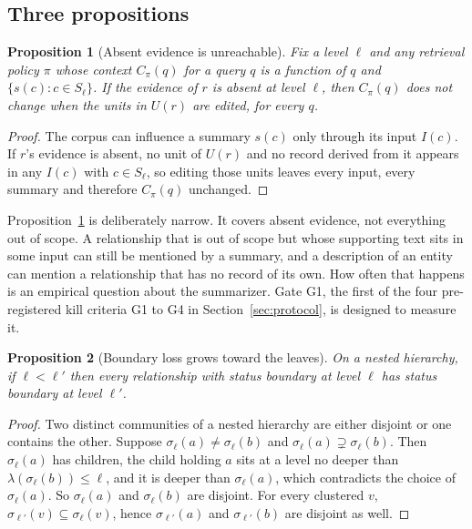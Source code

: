 \documentclass[journal]{IEEEtran}
\newtheorem{proposition}{Proposition}
\theoremstyle{remark}
\newcommand{\Sel}{\sigma_\ell}
\newcommand{\In}{I}
\begin{document}
\subsection{Three propositions}

\begin{proposition}[Absent evidence is unreachable]\label{prop:unreach}
Fix a level $\ell$ and any retrieval policy $\pi$ whose context $C_\pi(q)$ for a query $q$ is a function of $q$ and $\{s(c):c\in S_\ell\}$. If the evidence of $r$ is absent at level $\ell$, then $C_\pi(q)$ does not change when the units in $U(r)$ are edited, for every $q$.
\end{proposition}
\begin{proof}
The corpus can influence a summary $s(c)$ only through its input $\In(c)$. If $r$'s evidence is absent, no unit of $U(r)$ and no record derived from it appears in any $\In(c)$ with $c\in S_\ell$, so editing those units leaves every input, every summary and therefore $C_\pi(q)$ unchanged.
\end{proof}

Proposition~\ref{prop:unreach} is deliberately narrow. It covers absent evidence, not everything out of scope. A relationship that is out of scope but whose supporting text sits in some input can still be mentioned by a summary, and a description of an entity can mention a relationship that has no record of its own. How often that happens is an empirical question about the summarizer. Gate G1, the first of the four pre-registered kill criteria G1 to G4 in Section~\ref{sec:protocol}, is designed to measure it.

\begin{proposition}[Boundary loss grows toward the leaves]\label{prop:mono}
On a nested hierarchy, if $\ell<\ell'$ then every relationship with status boundary at level $\ell$ has status boundary at level $\ell'$.
\end{proposition}
\begin{proof}
Two distinct communities of a nested hierarchy are either disjoint or one contains the other. Suppose $\Sel(a)\ne\Sel(b)$ and $\Sel(a)\supsetneq\Sel(b)$. Then $\Sel(a)$ has children, the child holding $a$ sits at a level no deeper than $\lambda(\Sel(b))\le\ell$, and it is deeper than $\Sel(a)$, which contradicts the choice of $\Sel(a)$. So $\Sel(a)$ and $\Sel(b)$ are disjoint. For every clustered $v$, $\sigma_{\ell'}(v)\subseteq\Sel(v)$, hence $\sigma_{\ell'}(a)$ and $\sigma_{\ell'}(b)$ are disjoint as well.
\end{proof}
\end{document}
